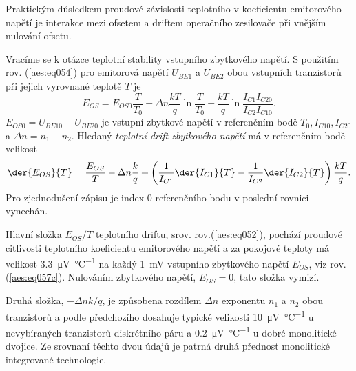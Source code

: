         Praktickým důsledkem proudové závislosti teplotního v koeficientu emitorového napětí je
        interakce mezi ofsetem a driftem operačního zesilovače při vnějším nulování ofsetu.

        Vracíme se k otázce teplotní stability vstupního zbytkového napětí. S použitím rov.
        (\ref{aes:eq054}) pro emitorová napětí \(U_{BE1}\) a \(U_{BE2}\) obou vstupních tranzistorů
        při jejich vyrovnané teplotě \(T\) je
        \begin{equation}\label{aes:eq058}
          E_{OS} = E_{OS0}\dfrac{T}{T_0} - \Delta n\dfrac{kT}{q}\ln\dfrac{T}{T_0} +
                   \dfrac{kT}{q}\ln\dfrac{I_{C1}I_{C20}}{I_{C2}I_{C10}}.    
        \end{equation}
        \(E_{OS0} = U_{BE10} - U_{BE20}\) je vstupní zbytkové napětí v referenčním bodě \(T_0,
        I_{C10}, I_{C20}\) a \(\Delta n = n_1 - n_2\). Hledaný \emph{teplotní drift zbytkového
        napětí} má v referenčním bodě velikost
        \begin{equation}\label{aes:eq059}
          \der{E_{OS}}{T} = \dfrac{E_{OS}}{T} - \Delta n\dfrac{k}{q} + 
                           \left(\dfrac{1}{I_{C1}}\der{I_{C1}}{T} -
                                 \dfrac{1}{I_{C2}}\der{I_{C2}}{T}
                           \right)\dfrac{kT}{q}.
        \end{equation}  
        Pro zjednodušení zápisu je index 0 referenčního bodu v poslední rovnici vynechán.

        Hlavní složka \(E_{OS}/T\) teplotního driftu, srov. rov.(\ref{aes:eq052}), pochází proudové
        citlivosti teplotního koeficientu emitorového napětí a za pokojové teploty má velikost
        \SI{3.3}{\uV\per\degreeCelsius} na každý \SI{1}{\mV} vstupního zbytkového napětí \(E_{OS}\),
        viz rov. (\ref{aes:eq057c}). Nulováním zbytkového napětí, \(E_{OS} = 0\), tato složka
        vymizí.

        Druhá složka, \(-\Delta nk/q\), je způsobena rozdílem \(\Delta n\) exponentu \(n_1\) a
        \(n_2\) obou tranzistorů a podle předchozího dosahuje typické velikosti
        \SI{10}{\uV\per\degreeCelsius} u nevybíraných tranzistorů diskrétního páru a
        \SI{0.2}{\uV\per\degreeCelsius} u dobré monolitické dvojice. Ze srovnaní těchto dvou údajů
        je patrná druhá přednost monolitické integrované technologie.

